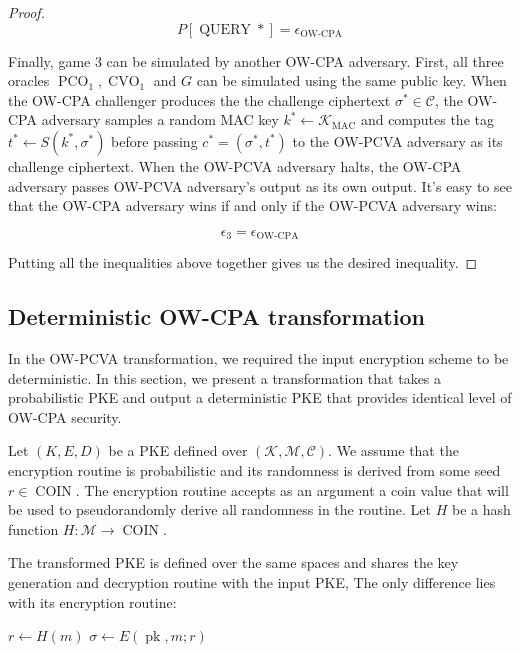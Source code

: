 \documentclass{article}
\newcommand{\pk}{\operatorname{pk}}
\newcommand{\pco}{\operatorname{PCO}}
\newcommand{\cvo}{\operatorname{CVO}}
\newcommand{\coin}{\operatorname{COIN}}
\newlength{\wdth}
\newcommand{\strike}[1]{\settowidth{\wdth}{#1}\rlap{\rule[.5ex]{\wdth}{.4pt}}#1}
\begin{document}
\begin{proof}
    \begin{equation*}
        P[\operatorname{QUERY}\ast] = \epsilon_\text{OW-CPA}
    \end{equation*}

    Finally, game 3 can be simulated by another OW-CPA adversary. First, all three oracles $\pco_1, \cvo_1$ and $G$ can be simulated using the same public key. When the OW-CPA challenger produces the the challenge ciphertext $\sigma^\ast \in \mathcal{C}$, the OW-CPA adversary samples a random MAC key $k^\ast \leftarrow \mathcal{K}_\text{MAC}$ and computes the tag $t^\ast \leftarrow S(k^\ast, \sigma^\ast)$ before passing $c^\ast = (\sigma^\ast, t^\ast)$ to the OW-PCVA adversary as its challenge ciphertext. When the OW-PCVA adversary halts, the OW-CPA adversary passes OW-PCVA adversary's output as its own output. It's easy to see that the OW-CPA adversary wins if and only if the OW-PCVA adversary wins:

    \begin{equation*}
        \epsilon_3 = \epsilon_\text{OW-CPA}
    \end{equation*}

    Putting all the inequalities above together gives us the desired inequality.
\end{proof}

\subsection{Deterministic OW-CPA transformation}
In the OW-PCVA transformation, we required the input encryption scheme to be deterministic. In this section, we present a transformation that takes a probabilistic PKE and output a deterministic PKE that provides identical level of OW-CPA security.

Let $(K, E, D)$ be a PKE defined over $(\mathcal{K}, \mathcal{M}, \mathcal{C})$. We assume that the encryption routine is probabilistic and its randomness is derived from some seed $r \in \coin$. The encryption routine accepts as an argument a coin value that will be used to pseudorandomly derive all randomness in the routine. Let $H$ be a hash function $H: \mathcal{M} \rightarrow \coin$.

The transformed PKE is defined over the same spaces and shares the key generation and decryption routine with the input PKE, The only difference lies with its encryption routine:

\begin{algorithm}[H]
    \caption{$E^{\strike{\$}}$}
    \SetAlgoLined
    \KwIn{
        $(\pk, m)$
    }
    $r \leftarrow H(m)$\;
    $\sigma \leftarrow E(\pk, m; r)$\;
    \Return{$\sigma$}
\end{algorithm}
\end{document}
